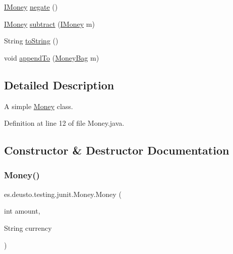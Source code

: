 \begin{DoxyCompactItemize}
\item 
\hyperlink{interfacees_1_1deusto_1_1testing_1_1junit_1_1_i_money}{I\+Money} \hyperlink{classes_1_1deusto_1_1testing_1_1junit_1_1_money_ae5f0bc3ea87f1fd55d6478653b8f2e36}{negate} ()
\item 
\hyperlink{interfacees_1_1deusto_1_1testing_1_1junit_1_1_i_money}{I\+Money} \hyperlink{classes_1_1deusto_1_1testing_1_1junit_1_1_money_aada973cd1a31410ed2b7e5d2ae6bc2e9}{subtract} (\hyperlink{interfacees_1_1deusto_1_1testing_1_1junit_1_1_i_money}{I\+Money} m)
\item 
String \hyperlink{classes_1_1deusto_1_1testing_1_1junit_1_1_money_af9e655069123757bea0efecc4efcd638}{to\+String} ()
\item 
void \hyperlink{classes_1_1deusto_1_1testing_1_1junit_1_1_money_aa9a6df9f35118060914ae6e8f74d1d51}{append\+To} (\hyperlink{classes_1_1deusto_1_1testing_1_1junit_1_1_money_bag}{Money\+Bag} m)
\end{DoxyCompactItemize}


\subsection{Detailed Description}
A simple \hyperlink{classes_1_1deusto_1_1testing_1_1junit_1_1_money}{Money} class. 

Definition at line 12 of file Money.\+java.



\subsection{Constructor \& Destructor Documentation}
\mbox{\label{classes_1_1deusto_1_1testing_1_1junit_1_1_money_a6f1749eb364c59ed038f79cf8965e3bc}} 
\subsubsection{\texorpdfstring{Money()}{Money()}}
{\footnotesize\ttfamily es.\+deusto.\+testing.\+junit.\+Money.\+Money (\begin{DoxyParamCaption}\item[{int}]{amount,  }\item[{String}]{currency }\end{DoxyParamCaption})}

